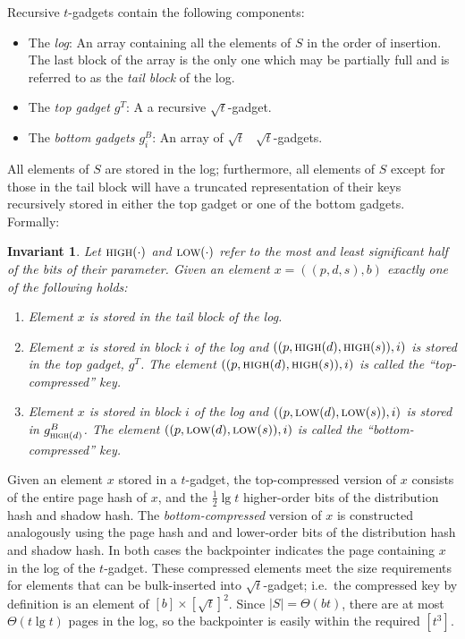 \documentclass[letterpaper,11pt]{article}
\newtheorem{invariant}[theorem]{Invariant}
\newcommand{\proc}[1]{\textnormal{\scshape#1}}
\newcommand{\MSB}{\proc{high}}
\newcommand{\LSB}{\proc{low}}
\begin{document}
Recursive $t$-gadgets contain the following components:

\begin{itemize}
\item The \emph{log}: An array containing all the elements of $S$ in
  the order of insertion. The last block of the array is the only one
  which may be partially full and is referred to as the \emph{tail
    block} of the log.

\item The \emph{top gadget $g^T$}: A a recursive $\sqrt{t}$-gadget.

\item The \emph{bottom gadgets $g^B_i$}: An array of $\sqrt{t}$~
  $\sqrt{t}$-gadgets.

\end{itemize}

All elements of $S$ are stored in the log; furthermore, all elements
of $S$ except for those in the tail block will have a truncated
representation of their keys recursively stored in either the top
gadget or one of the bottom gadgets. Formally:

\begin{invariant} \label{inv}
Let $\MSB(\cdot)$ and $\LSB(\cdot)$ refer to the most and least
significant half of the bits of their parameter. Given an element
$x=((p,d,s),b)$ exactly one of the following holds:

\begin{enumerate}

\item \label{c1} Element $x$ is stored in the tail block of the log.

\item \label{c2} Element $x$ is stored in block $i$ of the log and
  $((p,\MSB(d),\MSB(s)),i)$ is stored in the top gadget, $g^T$. The
  element $((p,\MSB(d),\MSB(s)),i)$ is called the
  ``\emph{top-compressed}'' key.

\item \label{c3} Element $x$ is stored in block $i$ of the log and
  $((p,\LSB(d),\LSB(s)),i)$ is stored in $g^B_{\MSB(d)}$. The element
  $((p,\LSB(d),\LSB(s)),i)$ is called the ``\emph{bottom-compressed}''
  key.
\end{enumerate}

\end{invariant}

Given an element $x$ stored in a $t$-gadget, the top-compressed
version of $x$ consists of the entire page hash of $x$, and the
$\frac{1}{2}\lg t$ higher-order bits of the distribution hash and
shadow hash.  The \emph{bottom-compressed} version of $x$ is
constructed analogously using the page hash and and lower-order bits
of the distribution hash and shadow hash. In both cases the
backpointer indicates the page containing $x$ in the log of the
$t$-gadget. These compressed elements meet the size requirements for
elements that can be bulk-inserted into $\sqrt{t}$-gadget; i.e.~the
compressed key by definition is an element of $[b]\times[\sqrt{t}]^2$.
Since $|S| = \Theta(bt)$, there are at most $\Theta(t\lg t)$ pages in
the log, so the backpointer is easily within the required $[t^3]$.
\end{document}
